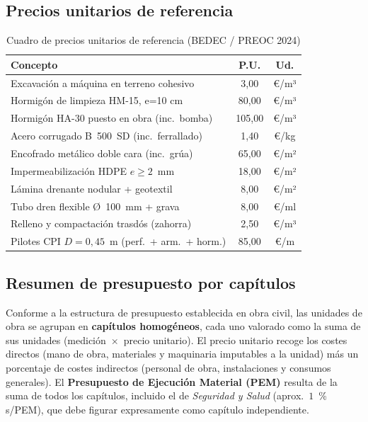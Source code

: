 \subsection{Precios unitarios de referencia}
\label{subsec:precios_unitarios}

\begin{table}[H]
  \centering
  \caption{Cuadro de precios unitarios de referencia (BEDEC / PREOC 2024)}
  \label{tab:precios}
  \begin{tabular}{@{}lcc@{}}
    \toprule
    \textbf{Concepto} & \textbf{P.U.} & \textbf{Ud.} \\
    \midrule
    Excavación a máquina en terreno cohesivo   & 3{,}00   & \euro/m³ \\
    Hormigón de limpieza HM-15, e=10 cm        & 80{,}00  & \euro/m³ \\
    Hormigón HA-30 puesto en obra (inc.\ bomba)& 105{,}00 & \euro/m³ \\
    Acero corrugado B~500~SD (inc.\ ferrallado)& 1{,}40   & \euro/kg \\
    Encofrado metálico doble cara (inc.\ grúa) & 65{,}00  & \euro/m² \\
    Impermeabilización HDPE $e \geq 2$~mm      & 18{,}00  & \euro/m² \\
    Lámina drenante nodular + geotextil        & 8{,}00   & \euro/m² \\
    Tubo dren flexible Ø~100~mm + grava        & 8{,}00   & \euro/ml \\
    Relleno y compactación trasdós (zahorra)   & 2{,}50   & \euro/m³ \\
    Pilotes CPI $D=0{,}45$~m (perf.\ + arm.\ + horm.) & 85{,}00 & \euro/m \\
    \bottomrule
  \end{tabular}
\end{table}

\subsection{Resumen de presupuesto por capítulos}
\label{subsec:presupuesto}

Conforme a la estructura de presupuesto establecida en obra civil, las
unidades de obra se agrupan en \textbf{capítulos homogéneos}, cada uno valorado
como la suma de sus unidades (medición~$\times$~precio unitario). El precio unitario
recoge los costes directos (mano de obra, materiales y maquinaria imputables a
la unidad) más un porcentaje de costes indirectos (personal de obra,
instalaciones y consumos generales). El \textbf{Presupuesto de Ejecución
Material (PEM)} resulta de la suma de todos los capítulos, incluido el de
\emph{Seguridad y Salud} (aprox.\ $1$~\% s/PEM), que debe figurar expresamente
como capítulo independiente.

